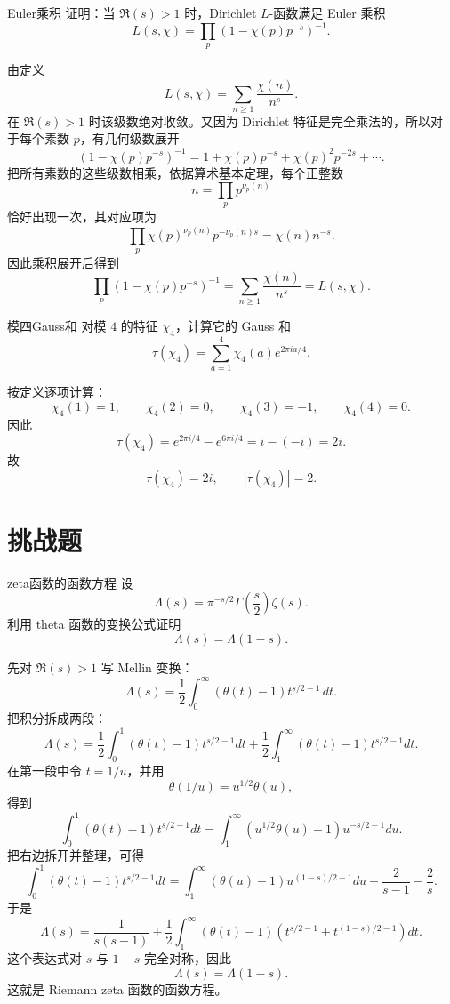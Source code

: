 \begin{problem}{Euler乘积}
\medium
证明：当 $\Re(s)>1$ 时，Dirichlet $L$-函数满足 Euler 乘积
\[
L(s,\chi)=\prod_p \left(1-\chi(p)p^{-s}\right)^{-1}.
\]
\end{problem}
\begin{solution}
由定义
\[
L(s,\chi)=\sum_{n\ge1}\frac{\chi(n)}{n^s}.
\]
在 $\Re(s)>1$ 时该级数绝对收敛。又因为 Dirichlet 特征是完全乘法的，所以对于每个素数 $p$，有几何级数展开
\[
\left(1-\chi(p)p^{-s}\right)^{-1}=1+\chi(p)p^{-s}+\chi(p)^2p^{-2s}+\cdots.
\]
把所有素数的这些级数相乘，依据算术基本定理，每个正整数
\[
n=\prod_p p^{\nu_p(n)}
\]
恰好出现一次，其对应项为
\[
\prod_p \chi(p)^{\nu_p(n)}p^{-\nu_p(n)s}=\chi(n)n^{-s}.
\]
因此乘积展开后得到
\[
\prod_p \left(1-\chi(p)p^{-s}\right)^{-1}
=\sum_{n\ge1}\frac{\chi(n)}{n^s}=L(s,\chi).
\]
\end{solution}

\begin{problem}{模四Gauss和}
\medium
对模 $4$ 的特征 $\chi_4$，计算它的 Gauss 和
\[
\tau(\chi_4)=\sum_{a=1}^{4}\chi_4(a)e^{2\pi i a/4}.
\]
\end{problem}
\begin{solution}
按定义逐项计算：
\[
\chi_4(1)=1,\qquad \chi_4(2)=0,\qquad \chi_4(3)=-1,\qquad \chi_4(4)=0.
\]
因此
\[
\tau(\chi_4)=e^{2\pi i/4}-e^{6\pi i/4}=i-(-i)=2i.
\]
故
\[
\tau(\chi_4)=2i,
\qquad
|\tau(\chi_4)|=2.
\]
\end{solution}

\section{挑战题 \hard}

\begin{problem}{zeta函数的函数方程}
\hard
设
\[
\Lambda(s)=\pi^{-s/2}\Gamma\!\left(\frac{s}{2}\right)\zeta(s).
\]
利用 theta 函数的变换公式证明
\[
\Lambda(s)=\Lambda(1-s).
\]
\end{problem}
\begin{solution}
先对 $\Re(s)>1$ 写 Mellin 变换：
\[
\Lambda(s)=\frac12\int_0^{\infty}(\theta(t)-1)t^{s/2-1}\,dt.
\]
把积分拆成两段：
\[
\Lambda(s)=\frac12\int_0^1(\theta(t)-1)t^{s/2-1}dt
+\frac12\int_1^{\infty}(\theta(t)-1)t^{s/2-1}dt.
\]
在第一段中令 $t=1/u$，并用
\[
\theta(1/u)=u^{1/2}\theta(u),
\]
得到
\[
\int_0^1(\theta(t)-1)t^{s/2-1}dt
=\int_1^{\infty}(u^{1/2}\theta(u)-1)u^{-s/2-1}du.
\]
把右边拆开并整理，可得
\[
\int_0^1(\theta(t)-1)t^{s/2-1}dt
=\int_1^{\infty}(\theta(u)-1)u^{(1-s)/2-1}du+\frac{2}{s-1}-\frac{2}{s}.
\]
于是
\[
\Lambda(s)=\frac{1}{s(s-1)}+\frac12\int_1^{\infty}(\theta(t)-1)
\left(t^{s/2-1}+t^{(1-s)/2-1}\right)dt.
\]
这个表达式对 $s$ 与 $1-s$ 完全对称，因此
\[
\Lambda(s)=\Lambda(1-s).
\]
这就是 Riemann zeta 函数的函数方程。
\end{solution}

